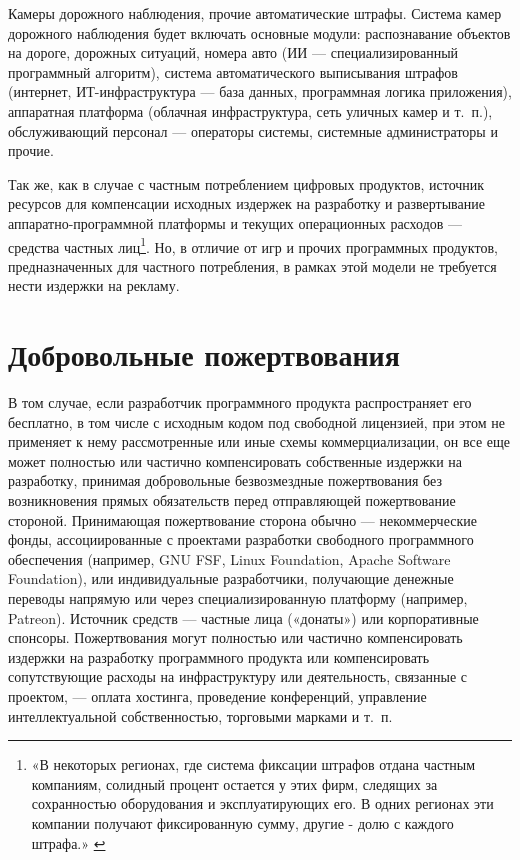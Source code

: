 \documentclass{article}
\begin{document}
Камеры дорожного наблюдения, прочие автоматические штрафы. Система камер дорожного наблюдения будет включать основные модули: распознавание объектов на дороге, дорожных ситуаций, номера авто (ИИ — специализированный программный алгоритм), система автоматического выписывания штрафов (интернет, ИТ-инфраструктура — база данных, программная логика приложения), аппаратная платформа (облачная инфраструктура, сеть уличных камер и т.~п.), обслуживающий персонал — операторы системы, системные администраторы и прочие.

Так же, как в случае с частным потреблением цифровых продуктов, источник ресурсов для компенсации исходных издержек на разработку и развертывание аппаратно-программной платформы и текущих операционных расходов — средства частных лиц\footnote{«В некоторых регионах, где система фиксации штрафов отдана частным компаниям, солидный процент остается у этих фирм, следящих за сохранностью оборудования и эксплуатирующих его. В одних регионах эти компании получают фиксированную сумму, другие - долю с каждого штрафа.» \cite{autoFineRF}}. Но, в отличие от игр и прочих программных продуктов, предназначенных для частного потребления, в рамках этой модели не требуется нести издержки на рекламу.

\section*{Добровольные пожертвования}

В том случае, если разработчик программного продукта распространяет его бесплатно, в том числе с исходным кодом под свободной лицензией, при этом не применяет к нему рассмотренные или иные схемы коммерциализации, он все еще может полностью или частично компенсировать собственные издержки на разработку, принимая добровольные безвозмездные пожертвования без возникновения прямых обязательств перед отправляющей пожертвование стороной. Принимающая пожертвование сторона обычно — некоммерческие фонды, ассоциированные с проектами разработки свободного программного обеспечения (например, GNU FSF, Linux Foundation, Apache Software Foundation), или индивидуальные разработчики, получающие денежные переводы напрямую или через специализированную платформу (например, Patreon). Источник средств — частные лица («донаты») или корпоративные спонсоры. Пожертвования могут полностью или частично компенсировать издержки на разработку программного продукта или компенсировать сопутствующие расходы на инфраструктуру или деятельность, связанные с проектом, — оплата хостинга, проведение конференций, управление интеллектуальной собственностью, торговыми марками и т.~п.
\end{document}
